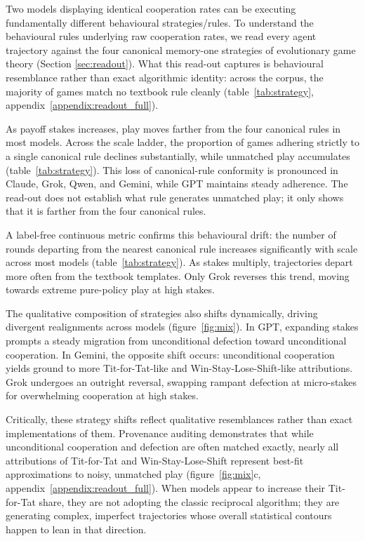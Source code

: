 \documentclass[11pt,a4paper]{article}
\begin{document}
Two models displaying identical cooperation rates can be executing fundamentally
different behavioural strategies/rules. To understand the behavioural rules underlying raw
cooperation rates, we read every agent trajectory against the four canonical
memory-one strategies of evolutionary game theory (Section \ref{sec:readout}). What
this read-out captures is behavioural resemblance rather than exact algorithmic
identity: across the corpus, the majority of games match no textbook rule
cleanly (table~\ref{tab:strategy}, appendix~\ref{appendix:readout_full}).

As payoff stakes increases, play moves farther from the four canonical rules in
most models. Across the scale ladder, the proportion of games adhering
strictly to a single canonical rule declines substantially, while unmatched
play accumulates (table~\ref{tab:strategy}). This loss of canonical-rule
conformity is pronounced in Claude, Grok, Qwen, and Gemini, while GPT maintains
steady adherence. The read-out does not establish what rule generates unmatched
play; it only shows that it is farther from the four canonical rules.

A label-free continuous metric confirms this behavioural drift: the number of
rounds departing from the nearest canonical rule increases significantly with
scale across most models (table~\ref{tab:strategy}). As stakes multiply,
trajectories depart more often from the textbook templates. Only Grok reverses
this trend, moving towards extreme pure-policy play at high stakes.

The qualitative composition of strategies also shifts dynamically, driving
divergent realignments across models (figure~\ref{fig:mix}). In GPT, expanding
stakes prompts a steady migration from unconditional defection toward
unconditional cooperation. In Gemini, the opposite shift occurs: unconditional
cooperation yields ground to more Tit-for-Tat-like and Win-Stay-Lose-Shift-like
attributions. Grok undergoes an outright
reversal, swapping rampant defection at micro-stakes for overwhelming cooperation
at high stakes.

Critically, these strategy shifts reflect qualitative resemblances rather than
exact implementations of them. Provenance auditing demonstrates that while unconditional
cooperation and defection are often matched exactly, nearly all attributions of
Tit-for-Tat and Win-Stay-Lose-Shift represent best-fit approximations to noisy,
unmatched play (figure~\ref{fig:mix}c, appendix~\ref{appendix:readout_full}).
When models appear to increase their Tit-for-Tat share, they are not adopting the
classic reciprocal algorithm; they are generating complex, imperfect trajectories
whose overall statistical contours happen to lean in that direction.
\end{document}
